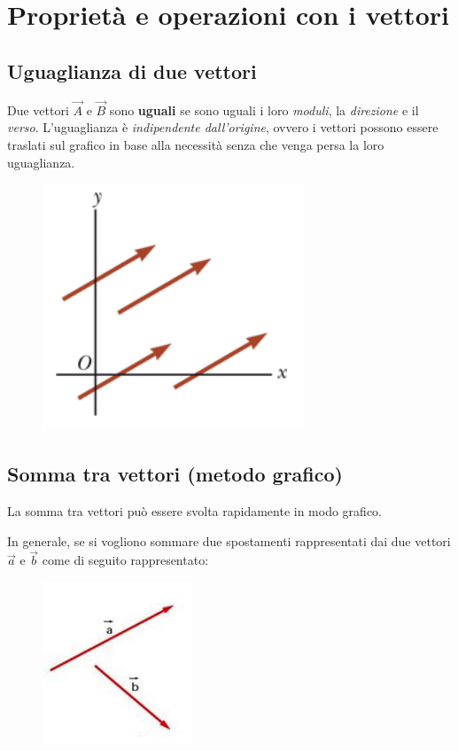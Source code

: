 \documentclass[12pt,oneside]{book}
\begin{document}
\newpage
\section{Proprietà e operazioni con i vettori}
\subsection{Uguaglianza di due vettori}
Due vettori $\vec{A}$ e $\vec{B}$ sono \textbf{uguali} se sono uguali i loro \emph{moduli}, la \emph{direzione} e il \emph{verso}.
L'uguaglianza è \emph{indipendente dall'origine}, ovvero i vettori possono essere traslati sul grafico in base alla necessità
senza che venga persa la loro uguaglianza.
\begin{figure}[h]
    \includegraphics[scale=0.5]{uguaglianza_vettori}
    \centering
\end{figure}

\subsection{Somma tra vettori (metodo grafico)}
La somma tra vettori può essere svolta rapidamente in modo grafico.

In generale, se si vogliono sommare due spostamenti rappresentati dai due vettori $\vec{a}$ e $\vec{b}$ come di seguito rappresentato:
\begin{figure}[h]
    \includegraphics[scale=0.5]{vettori_da_sommare}
    \centering
\end{figure}
\end{document}
